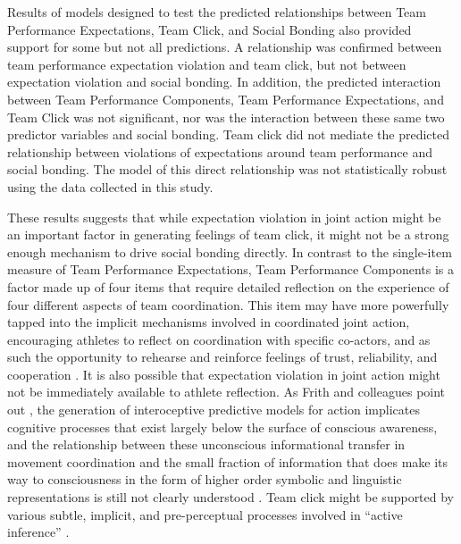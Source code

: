 \begin{CJK}{UTF8}{gbsn}
  Results of models designed to test the predicted relationships between Team Performance Expectations, Team Click, and Social Bonding also provided support for some but not all predictions. A relationship was confirmed between team performance expectation violation and team click, but not between expectation violation and social bonding. In addition, the predicted interaction between Team Performance Components, Team Performance Expectations, and Team Click was not significant, nor was the interaction between these same two predictor variables and social bonding.  Team click did not mediate the predicted relationship between violations of expectations around team performance and social bonding. The model of this direct relationship was not statistically robust using the data collected in this study.

  These results suggests that while expectation violation in joint action might be an important factor in generating feelings of team click, it might not be a strong enough mechanism to drive social bonding directly.  In contrast to the single-item measure of Team Performance Expectations, Team Performance Components is a factor made up of four items that require detailed reflection on the experience of four different aspects of team coordination.  This item may have more powerfully tapped into the implicit mechanisms involved in coordinated joint action, encouraging athletes to reflect on coordination with specific co-actors, and as such the opportunity to rehearse and reinforce feelings of trust, reliability, and cooperation \citep{Reddish2013a}.  It is also possible that expectation violation in joint action might not be immediately available to athlete reflection.
  As Frith and colleagues point out \textcite{Frith2007,Frith2010,Clark2013}, the generation of interoceptive predictive models for action implicates cognitive processes that exist largely below the surface of conscious awareness, and the relationship between these unconscious informational transfer in movement coordination and the small fraction of information that does make its way to consciousness in the form of higher order symbolic and linguistic representations is still not clearly understood \citep{Semin2008}. Team click might be supported by various subtle, implicit, and pre-perceptual processes involved in ``active inference'' \citep{Schmidt2011}.


\end{CJK}
